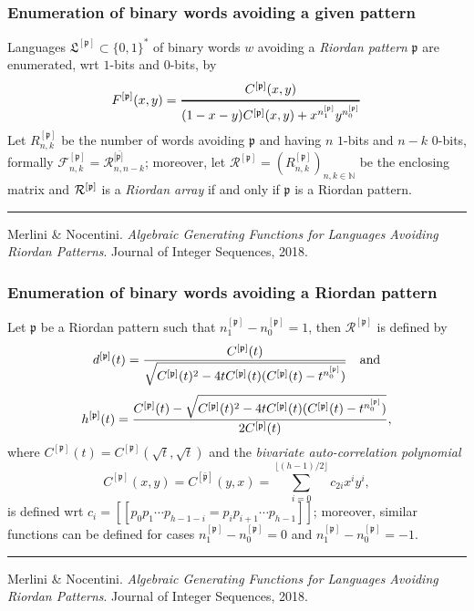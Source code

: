 \documentclass[9pt]{beamer}
\begin{document}
\begin{frame}[fragile]
\frametitle{Enumeration of binary words avoiding a given pattern}

Languages $\mathfrak{L}^{[\mathfrak{p}]}\subset \{0,1\}^*$ of binary words $w$
avoiding a \textit{Riordan pattern} $\mathfrak{p}$ are enumerated,
wrt $1$-bits and $0$-bits, by
$$F^{[\mathfrak{p}]}(x,y)
=\genfrac{}{}{1pt}{0}{C^{[\mathfrak{p}]}(x,y)}{(1-x-y)C^{[\mathfrak{p}]}(x,y)
+x^{n_1^{[\mathfrak{p}]}}y^{n_0^{[\mathfrak{p}]}}}$$
Let $R_{n,k}^{[\mathfrak{p}]}$ be the number of words avoiding $\mathfrak{p}$
and having $n$ $1$-bits  and $n-k$  $0$-bits, formally
${\mathcal{F}_{n,k}^{[\mathfrak{p}]}} = {\mathcal{R}_{n,
n-k}^{[\bar{\mathfrak{p}]}}}$; moreover, let
$\mathcal{R}^{[\mathfrak{p}]}=\left(R_{n,k}^{[\mathfrak{p}]}\right)_{n,k\in\mathbb{N}}$
be the enclosing matrix and ${\cal{R}^{[\mathfrak{p}]}}$ is a
\textit{Riordan array} if and only if  $\mathfrak{p}$ is a Riordan pattern.
\vfill
\noindent\rule{\textwidth}{0.1pt}
{\footnotesize
Merlini \& Nocentini. \textit{Algebraic Generating Functions for Languages
Avoiding Riordan Patterns}.  Journal of Integer Sequences, 2018.}
\end{frame}

\begin{frame}[fragile]
\frametitle{Enumeration of binary words avoiding a Riordan pattern}

Let $\mathfrak{p}$ be a Riordan pattern
such that $n_1^{[\mathfrak{p}]}-n_0^{[\mathfrak{p}]}=1$, then
$\mathcal{R}^{\left[\mathfrak{p}\right]}$ is defined by
$$d^{[\mathfrak{p}]}(t)={C^{[\mathfrak{p}]}(t)
\over \sqrt{C^{[\mathfrak{p}]}(t)^2-4tC^{[\mathfrak{p}]}(t)(C^{[\mathfrak{p}]}(t)-t^{n_0^{[\mathfrak{p}]}})}}\quad\text{and}$$
$$h^{[\mathfrak{p}]}(t)={C^{[\mathfrak{p}]}(t) -\sqrt{C^{[\mathfrak{p}]}(t)^2-4tC^{[\mathfrak{p}]}(t)(C^{[\mathfrak{p}]}(t)-t^{n_0^{[\mathfrak{p}]}})}
\over 2 C^{[\mathfrak{p}]}(t)},$$
where $C^{[\mathfrak{p}]}(t)=C^{[\mathfrak{p}]}(\sqrt{t},\sqrt{t})$
and the \textit{bivariate auto-correlation polynomial}
\begin{displaymath}
C^{[\mathfrak{p}]}(x,y)=C^{[\mathfrak{\bar{p}}]}(y,x)=\sum_{i=0}^{\lfloor(h-1)/2\rfloor}c_{2i}x^iy^i,
\end{displaymath}
is defined wrt $c_i=[\![p_0p_1\cdots p_{h-1-i}=p_{i}p_{i+1}\cdots p_{h-1}]\!]$;
moreover, similar functions can be defined for cases
$n_1^{[\mathfrak{p}]}-n_0^{[\mathfrak{p}]}=0$ and
$n_1^{[\mathfrak{p}]}-n_0^{[\mathfrak{p}]}=-1$.

\vfill
\noindent\rule{\textwidth}{0.1pt}
{\footnotesize
Merlini \& Nocentini. \textit{Algebraic Generating Functions for Languages
Avoiding Riordan Patterns}.  Journal of Integer Sequences, 2018.}
\end{frame}
\end{document}
